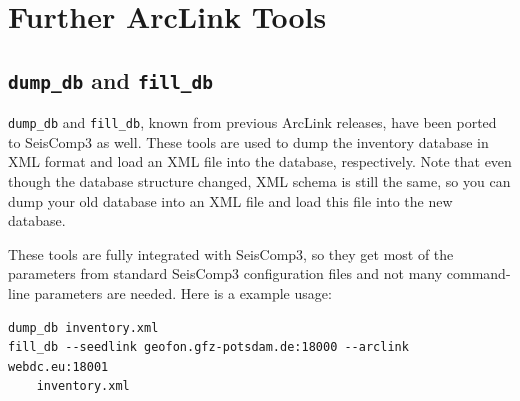 \documentclass[11pt,a4paper,titlepage]{article}
\newcommand{\cmd}[1]{\texttt{#1}}
\begin{document}





\section{Further ArcLink Tools}




\subsection{\cmd{dump\_db} and \cmd{fill\_db}}

\cmd{dump\_db} and \cmd{fill\_db}, known from previous ArcLink releases,
have been ported to SeisComp3 as well. These tools are used to dump the
inventory database in XML format and load an XML file into the database,
respectively.  Note that even though the database structure changed, XML
schema is still the same, so you can dump your old database into an XML
file and load this file into the new database.

These tools are fully integrated with SeisComp3, so they get most of the
parameters from standard SeisComp3 configuration files and not many
command-line parameters are needed. Here is a example usage:
\begin{verbatim}
dump_db inventory.xml
fill_db --seedlink geofon.gfz-potsdam.de:18000 --arclink webdc.eu:18001
    inventory.xml
\end{verbatim}
\end{document}
